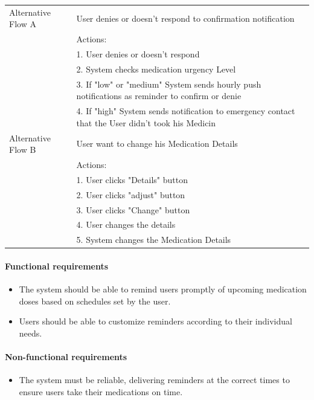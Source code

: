 \documentclass{article}
\begin{document}
\begin{table}[h!]
\begin{tabularx}{\textwidth}{|>{\raggedright\arraybackslash}p{}|X|}
        Alternative Flow A & User denies or doesn't respond to confirmation notification \\
                         & Actions: \\
                         & 1. User denies or doesn't respond \\
                         & 2. System checks medication urgency Level \\
                         & 3. If "low" or "medium" System sends hourly push notifications as reminder 
                           to confirm or denie \\
                         & 4. If "high" System sends notification to emergency contact that the User didn't took his Medicin \\ \hline
        Alternative Flow B & User want to change his Medication Details \\
                         & Actions: \\
                         & 1. User clicks "Details" button \\
                         & 2. User clicks "adjust" button \\
                         & 3. User clicks "Change" button \\
                         & 4. User changes the details \\
                         & 5. System changes the Medication Details\\ \hline
    \end{tabularx}
\end{table}

\paragraph{Functional requirements}
		\begin{itemize}
			\item  The system should be able to remind users promptly of upcoming medication doses based on schedules set by the user.
			\item  Users should be able to customize reminders according to their individual needs.
		\end{itemize}
		
	\paragraph{Non-functional requirements}
		\begin{itemize}
			\item The system must be reliable, delivering reminders at the correct times to ensure users take their medications on time.
		\end{itemize}
\end{document}

